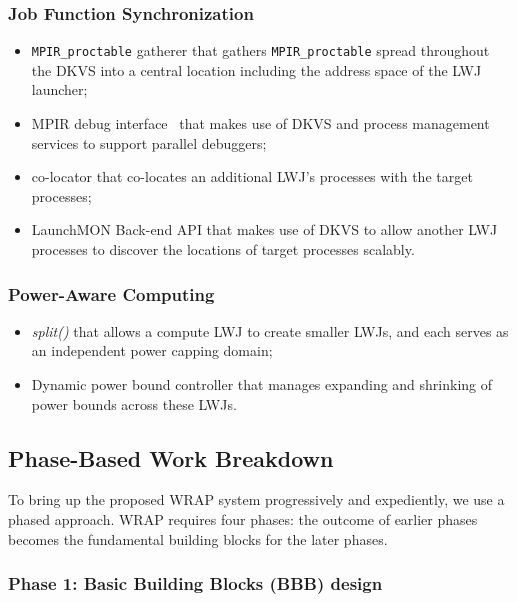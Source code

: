\subsubsection{Job Function Synchronization}
\begin{itemize}
\item{{\tt MPIR\_proctable} gatherer that gathers {\tt MPIR\_proctable} spread throughout the
DKVS into a central location including the address space of the LWJ launcher;}
\item{MPIR debug interface~\cite{MPIRInterface} that makes use of DKVS and process
management services to support parallel debuggers;}
\item{co-locator that co-locates an additional LWJ's processes with
the target processes;}
\item{LaunchMON Back-end API that makes use of DKVS to allow another LWJ processes
to discover the locations of target processes scalably.}
\end{itemize}

\subsubsection{Power-Aware Computing}
\begin{itemize}
\item{{\em split()} that allows a compute LWJ to create smaller LWJs, and each serves as an independent power capping domain;}
\item{Dynamic power bound controller that manages expanding and shrinking of power bounds across these LWJs.}
\end{itemize}

\subsection{Phase-Based Work Breakdown}
To bring up the proposed WRAP system progressively and expediently, we use a phased approach.
WRAP requires four phases: the outcome of earlier phases becomes the fundamental 
building blocks for the later phases.


\subsubsection{Phase 1: Basic Building Blocks (BBB) design}

